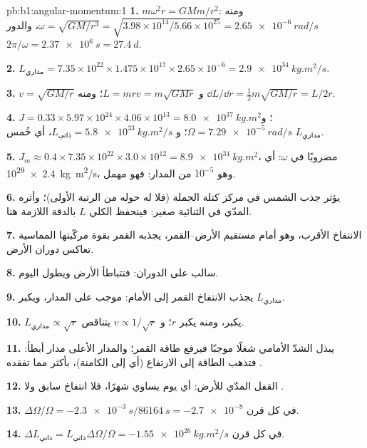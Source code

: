 \begin{solution}{pb:b1:angular-momentum:1}
\textbf{1.} $m\omega^2r = GMm/r^2$: ومنه $\omega = \sqrt{GM/r^3} = \sqrt{3.98\times
10^{14}/5.66\times10^{25}} = \qty{2.65e-6}{rad/s}$، والدور $2\pi/\omega =
\qty{2.37e6}{s} = \qty{27.4}{d}$.

\textbf{2.} $L_{\text{مداري}} = 7.35\times10^{22} \times 1.475\times10^{17}
\times 2.65\times10^{-6} = \qty{2.9e34}{kg.m^2/s}$.

\textbf{3.} $v = \sqrt{GM/r}$ و $L = mrv = m\sqrt{GMr}$؛ ومنه $\dd L/\dd r =
\tfrac12 m\sqrt{GM/r} = L/2r$.

\textbf{4.} $J = 0.33 \times 5.97\times10^{24} \times 4.06\times10^{13} =
\qty{8.0e37}{kg.m^2}$؛ و $\Omega = \qty{7.29e-5}{rad/s}$؛ و $L_{\text{ذاتي}} =
\qty{5.8e33}{kg.m^2/s}$، أي خُمس $L_{\text{مداري}}$.

\textbf{5.} $J_m \approx 0.4 \times 7.35\times10^{22} \times 3.0\times10^{12} =
\qty{8.9e34}{kg.m^2}$، مضروبًا في $\omega$: أي \qty{2.4e29}{kg.m^2/s}، وهو $10^{-5}$ من
 المدار: فهو مهمل.

\textbf{6.} يؤثر جذب الشمس في مركز كتلة الجملة
(فلا  له حوله من الرتبة الأولى)؛ وأثره المدّي في الثنائية
صغير: فينحفظ  الكلي $L$ بالدقة اللازمة هنا.

\textbf{7.} الانتفاخ الأقرب، وهو أمام مستقيم الأرض--القمر، يجذبه
القمر بقوة مركّبتها المماسية تعاكس دوران
الأرض.

\textbf{8.}  سالب على الدوران: فتتباطأ الأرض ويطول
اليوم.

\textbf{9.} يجذب الانتفاخ القمر إلى الأمام:  موجب على
المدار، ويكبر $L_{\text{مداري}}$.

\textbf{10.} $L_{\text{مداري}} \propto \sqrt r$ يكبر، ومنه يكبر $r$؛ و $v \propto
1/\sqrt r$ يتناقص.

\textbf{11.} يبذل الشدّ الأمامي شغلًا موجبًا فيرفع طاقة
القمر؛ والمدار الأعلى مدار أبطأ: فتذهب الطاقة إلى الارتفاع
(أي إلى الكامنة)، بأكثر مما تفقده .

\textbf{12.} القفل المدّي للأرض: أي يوم يساوي شهرًا، فلا انتفاخ
سابق ولا .

\textbf{13.} $\Delta\Omega/\Omega = -\qty{2.3e-3}{s}/\qty{86164}{s} =
\num{-2.7e-8}$ في كل قرن.

\textbf{14.} $\Delta L_{\text{ذاتي}} = L_{\text{ذاتي}}\Delta\Omega/\Omega =
\qty{-1.55e26}{kg.m^2/s}$ في كل قرن.


\end{solution}
